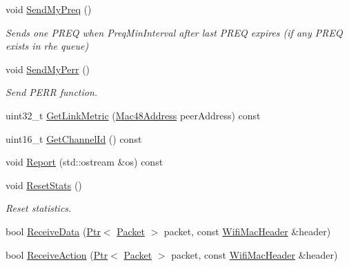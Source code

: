 \begin{DoxyCompactItemize}
\item 
void \hyperlink{classns3_1_1dot11s_1_1HwmpProtocolMac_a15742d45e557ccc5d3b7910bd86069aa}{Send\+My\+Preq} ()
\begin{DoxyCompactList}\small\item\em Sends one P\+R\+EQ when Preq\+Min\+Interval after last P\+R\+EQ expires (if any P\+R\+EQ exists in rhe queue) \end{DoxyCompactList}\item 
void \hyperlink{classns3_1_1dot11s_1_1HwmpProtocolMac_a3c8878daa030be0bc4f5338ec9acf78f}{Send\+My\+Perr} ()
\begin{DoxyCompactList}\small\item\em Send P\+E\+RR function. \end{DoxyCompactList}\item 
uint32\+\_\+t \hyperlink{classns3_1_1dot11s_1_1HwmpProtocolMac_a9467234ad958dd613776cfc9132d7b70}{Get\+Link\+Metric} (\hyperlink{classns3_1_1Mac48Address}{Mac48\+Address} peer\+Address) const 
\item 
uint16\+\_\+t \hyperlink{classns3_1_1dot11s_1_1HwmpProtocolMac_a17dfe4e123c65b68c279d5b11a82ec99}{Get\+Channel\+Id} () const 
\item 
void \hyperlink{classns3_1_1dot11s_1_1HwmpProtocolMac_ab8ccc1e7d0fdb06cef2243a3ed944094}{Report} (std\+::ostream \&os) const 
\item 
void \hyperlink{classns3_1_1dot11s_1_1HwmpProtocolMac_a8e84e6d914fa5e5bdc7f04760ca0b525}{Reset\+Stats} ()
\begin{DoxyCompactList}\small\item\em Reset statistics. \end{DoxyCompactList}\item 
bool \hyperlink{classns3_1_1dot11s_1_1HwmpProtocolMac_a71929de219e49a7b1c9e8c89e9b8f842}{Receive\+Data} (\hyperlink{classns3_1_1Ptr}{Ptr}$<$ \hyperlink{classns3_1_1Packet}{Packet} $>$ packet, const \hyperlink{classns3_1_1WifiMacHeader}{Wifi\+Mac\+Header} \&header)
\item 
bool \hyperlink{classns3_1_1dot11s_1_1HwmpProtocolMac_a9c518727d36191804c19fbe13c265a3b}{Receive\+Action} (\hyperlink{classns3_1_1Ptr}{Ptr}$<$ \hyperlink{classns3_1_1Packet}{Packet} $>$ packet, const \hyperlink{classns3_1_1WifiMacHeader}{Wifi\+Mac\+Header} \&header)
\end{DoxyCompactItemize}
